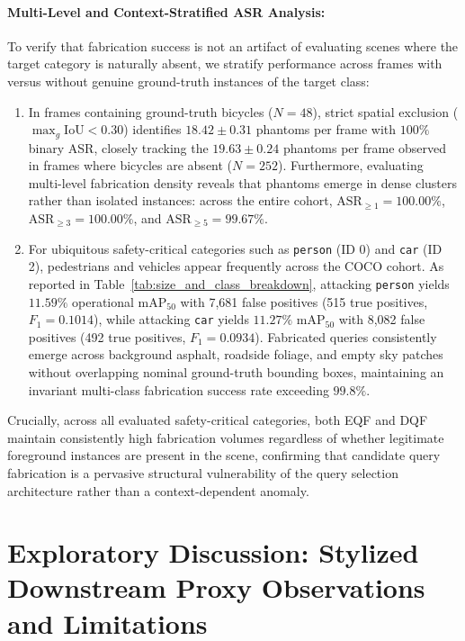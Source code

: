 \documentclass[preprint,12pt]{elsarticle}
\begin{document}
\paragraph{Multi-Level and Context-Stratified ASR Analysis:}
To verify that fabrication success is not an artifact of evaluating scenes where the target category is naturally absent, we stratify performance across frames with versus without genuine ground-truth instances of the target class:
\begin{enumerate}
    \item In frames containing ground-truth bicycles ($N=48$), strict spatial exclusion ($\max_g \mathrm{IoU} < 0.30$) identifies $18.42 \pm 0.31$ phantoms per frame with $100\%$ binary ASR, closely tracking the $19.63 \pm 0.24$ phantoms per frame observed in frames where bicycles are absent ($N=252$). Furthermore, evaluating multi-level fabrication density reveals that phantoms emerge in dense clusters rather than isolated instances: across the entire cohort, $\mathrm{ASR}_{\ge 1} = 100.00\%$, $\mathrm{ASR}_{\ge 3} = 100.00\%$, and $\mathrm{ASR}_{\ge 5} = 99.67\%$.
    \item For ubiquitous safety-critical categories such as \texttt{person} (ID 0) and \texttt{car} (ID 2), pedestrians and vehicles appear frequently across the COCO cohort. As reported in Table~\ref{tab:size_and_class_breakdown}, attacking \texttt{person} yields $11.59\%$ operational $\mathrm{mAP}_{50}$ with 7,681 false positives (515 true positives, $F_1 = 0.1014$), while attacking \texttt{car} yields $11.27\%$ $\mathrm{mAP}_{50}$ with 8,082 false positives (492 true positives, $F_1 = 0.0934$). Fabricated queries consistently emerge across background asphalt, roadside foliage, and empty sky patches without overlapping nominal ground-truth bounding boxes, maintaining an invariant multi-class fabrication success rate exceeding $99.8\%$.
\end{enumerate}
Crucially, across all evaluated safety-critical categories, both EQF and DQF maintain consistently high fabrication volumes regardless of whether legitimate foreground instances are present in the scene, confirming that candidate query fabrication is a pervasive structural vulnerability of the query selection architecture rather than a context-dependent anomaly.

\section{Exploratory Discussion: Stylized Downstream Proxy Observations and Limitations}
\label{sec:downstream_impact}
\end{document}
